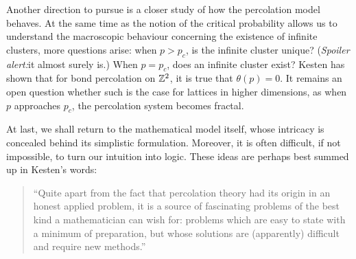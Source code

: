 \documentclass[a4paper, 12pt]{article}
\begin{document}
Another direction to pursue is a closer study of how the percolation model behaves. At the same time as the notion of the critical probability allows us to understand the macroscopic behaviour concerning the existence of infinite clusters, more questions arise: when $p > p_c$, is the infinite cluster unique? (\textit{Spoiler alert:}it almost surely is.) When $p = p_c$, does an infinite cluster exist? Kesten \autocite*[1--2]{kesten_1980} has shown that for bond percolation on $\mathbb{Z}^2$, it is true that $\theta(p) = 0$. It remains an open question whether such is the case for lattices in higher dimensions, as when $p$ approaches $p_c$, the percolation system becomes fractal.

At last, we shall return to the mathematical model itself, whose intricacy is concealed behind its simplistic formulation. Moreover, it is often difficult, if not impossible, to turn our intuition into logic. These ideas are perhaps best summed up in Kesten's words:

\begin{quotation}
``Quite apart from the fact that percolation theory had its origin in an honest applied problem, it is a source of fascinating problems of the best kind a mathematician can wish for: problems which are easy to state with a minimum of preparation, but whose solutions are (apparently) difficult and require new methods.''
\end{quotation}

\printbibliography
\end{document}
